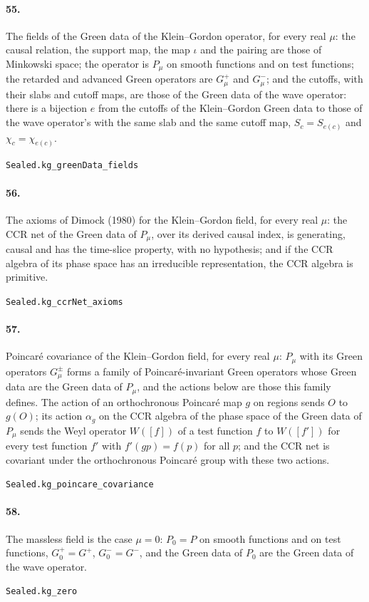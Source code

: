 \documentclass[11pt]{article}
\begin{document}
\paragraph{55.} The fields of the Green data of the Klein–Gordon operator, for every real $\mu$: the causal relation, the support map, the map $\iota$ and the pairing are those of Minkowski space; the operator is $P_\mu$ on smooth functions and on test functions; the retarded and advanced Green operators are $G_\mu^+$ and $G_\mu^-$; and the cutoffs, with their slabs and cutoff maps, are those of the Green data of the wave operator: there is a bijection $e$ from the cutoffs of the Klein–Gordon Green data to those of the wave operator's with the same slab and the same cutoff map, $S_c = S_{e(c)}$ and $\chi_c = \chi_{e(c)}$.\par{\footnotesize\texttt{Sealed.kg\_greenData\_fields}}

\paragraph{56.} The axioms of Dimock (1980) for the Klein–Gordon field, for every real $\mu$: the CCR net of the Green data of $P_\mu$, over its derived causal index, is generating, causal and has the time-slice property, with no hypothesis; and if the CCR algebra of its phase space has an irreducible representation, the CCR algebra is primitive.\par{\footnotesize\texttt{Sealed.kg\_ccrNet\_axioms}}

\paragraph{57.} Poincaré covariance of the Klein–Gordon field, for every real $\mu$: $P_\mu$ with its Green operators $G_\mu^\pm$ forms a family of Poincaré-invariant Green operators whose Green data are the Green data of $P_\mu$, and the actions below are those this family defines. The action of an orthochronous Poincaré map $g$ on regions sends $O$ to $g(O)$; its action $\alpha_g$ on the CCR algebra of the phase space of the Green data of $P_\mu$ sends the Weyl operator $W([f])$ of a test function $f$ to $W([f'])$ for every test function $f'$ with $f'(g p) = f(p)$ for all $p$; and the CCR net is covariant under the orthochronous Poincaré group with these two actions.\par{\footnotesize\texttt{Sealed.kg\_poincare\_covariance}}

\paragraph{58.} The massless field is the case $\mu = 0$: $P_0 = P$ on smooth functions and on test functions, $G_0^+ = G^+$, $G_0^- = G^-$, and the Green data of $P_0$ are the Green data of the wave operator.\par{\footnotesize\texttt{Sealed.kg\_zero}}
\end{document}
